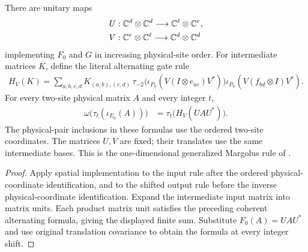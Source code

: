\begin{lemma}
    \label{lem:qca_fixed_margolus_gates}
    \leanok
    There are unitary maps
    \begin{align}
        U & : \mathbb C^d\otimes\mathbb C^d\longrightarrow
        \mathbb C^\ell\otimes\mathbb C^r,\notag               \\
        V & : \mathbb C^r\otimes\mathbb C^\ell\longrightarrow
        \mathbb C^d\otimes\mathbb C^d
    \end{align}
    implementing $F_0$ and $G$ in increasing physical-site order. For
    intermediate matrices $K$, define the literal alternating gate rule
    \begin{align}
        H_V(K)=\sum_{a,b,c,d}K_{(a,b),(c,d)}\,
        \tau_{-2}\bigl(\iota_{P_0}(V(I\otimes e_{ac})V^*)\bigr)
        \iota_{P_0}(V(f_{bd}\otimes I)V^*).
    \end{align}
    For every two-site physical matrix $A$ and every integer $t$,
    \begin{align}
        \omega\bigl(\tau_t(\iota_{E_0}(A))\bigr)
         & =\tau_t\bigl(H_V(UAU^*)\bigr).
    \end{align}
    The physical-pair inclusions in these formulas use the ordered
    two-site coordinates. The matrices $U,V$ are fixed; their translates
    use the same intermediate bases. This is the one-dimensional
    generalized Margolus rule of
    \cite[equations~bruleU and bruleV, lines~980--1001 and~1033--1041]{SchumacherWerner2004QCA}.
\end{lemma}
\begin{proof}
    \leanok
    Apply spatial implementation to the input rule after the ordered
    physical-coordinate identification, and to the shifted output rule
    before the inverse physical-coordinate identification. Expand the
    intermediate input matrix into matrix units. Each product matrix
    unit satisfies the preceding coherent alternating formula, giving
    the displayed finite sum. Substitute $F_0(A)=UAU^*$ and use original
    translation covariance to obtain the formula at every integer shift.
\end{proof}
